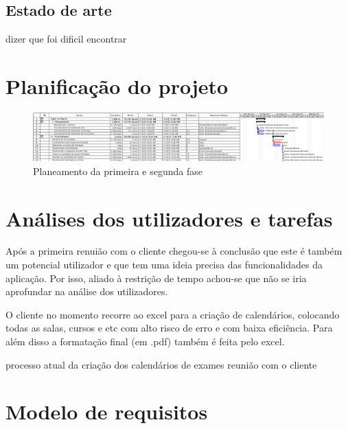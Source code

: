 \documentclass[11pt, twoside]{report}
\begin{document}
	\section{Estado de arte}
	
	
	dizer que foi dificil encontrar
	
	\chapter{Planificação do projeto}

 	
		
	\clearpage
	\begin{landscape}
		\pagestyle{empty}
		
		\begin{figure}[H] 
			\centering 			\includegraphics[width=1.4\textwidth,height=1.4\textheight,keepaspectratio]{image/planeamento_1fase}
			\caption{Planeamento da primeira e segunda fase}
			
		\end{figure}
	\end{landscape}
	
	
	\chapter{Análises dos utilizadores e tarefas}
	
	Após a primeira renuião com o cliente chegou-se à conclusão que  este é também um potencial utilizador e que tem uma ideia precisa das funcionalidades da aplicação. Por isso, aliado à restrição de tempo achou-se que não se iria aprofundar na análise dos utilizadores. 
	
	O cliente no momento recorre ao excel para a criação de calendários,  colocando todas as salas, cursos e etc com alto risco de erro e com baixa eficiência. Para além disso a formatação final (em .pdf) também é feita pelo excel.

	
	



	processo atual da criação dos calendários de exames
	reunião com o cliente
	
	\chapter{Modelo de requisitos}
\end{document}
